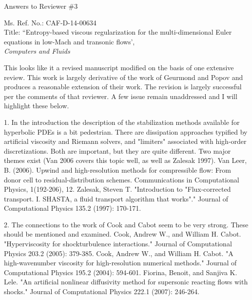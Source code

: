 \documentclass{article}
\begin{document}
\begin{center}
{ \Large Answers to Reviewer \#3}
\end{center}

\bigskip

\noindent Ms. Ref. No.: CAF-D-14-00634\\
Title: ``Entropy-based viscous regularization for the multi-dimensional Euler equations in low-Mach and transonic flows', \\
{\it Computers and Fluids}\\

\bigskip
\bigskip

{
\color{blue}
This looks like it a revised manuscript modified on the basis of one
extensive review.
This work is largely derivative of the work of Geurmond and Popov and
produces a reasonable extension of their work. The revision is largely
successful per the comments of that reviewer. A few issue remain
unaddressed and I will highlight these below.
}

\bigskip

{
\color{blue}
1. In the introduction the description of the stabilization methods
available for hyperbolic PDEs is a bit pedestrian. There are dissipation
approaches typified by artificial viscosity and Riemann solvers, and
"limiters" associated with high-order discretizations. Both are important,
but they are quite different. Two major themes exist (Van 2006 covers
this topic well, as well as Zalesak 1997).
Van Leer, B. (2006). Upwind and high-resolution methods for
compressible flow: From donor cell to residual-distribution schemes.
Communications in Computational Physics, 1(192-206), 12.
Zalesak, Steven T. "Introduction to "Flux-corrected transport. I. SHASTA,
a fluid transport algorithm that works"." Journal of Computational Physics
135.2 (1997): 170-171.}

\bigskip


{
\color{blue}
2. The connections to the work of Cook and Cabot seem to be very
strong. These should be mentioned and examined.
Cook, Andrew W., and William H. Cabot. "Hyperviscosity for shockturbulence
interactions." Journal of Computational Physics 203.2 (2005):
379-385.
Cook, Andrew W., and William H. Cabot. "A high-wavenumber viscosity
for high-resolution numerical methods." Journal of Computational Physics
195.2 (2004): 594-601.
Fiorina, Benoit, and Sanjiva K. Lele. "An artificial nonlinear diffusivity
method for supersonic reacting flows with shocks." Journal of
Computational Physics 222.1 (2007): 246-264.}
\end{document}
